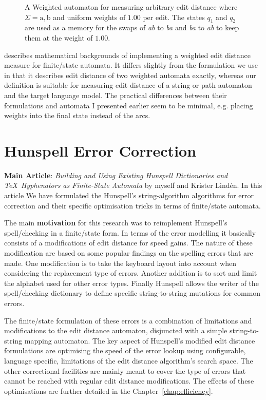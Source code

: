 \documentclass[officiallayout]{unihelcompling}
\begin{document}
\begin{figure}
    \caption{A Weighted automaton for measuring arbitrary edit distance where
        $\Sigma = {\mathrm{a}, \mathrm{b}}$ and uniform weights of $1.00$ per
        edit. The states $q_1$ and $q_2$ are used as a memory for
        the swaps of \emph{ab} to \emph{ba} and \emph{ba} to \emph{ab} to
        keep them at the weight of $1.00$. \label{fig:edit-weighted}}
\end{figure}

\citet{mohri2003edit} describes mathematical backgrounds of implementing a
weighted edit distance measure for finite\-/state automata. It differs slightly
from the formulation we use in that it describes edit distance of two weighted
automata exactly, whereas our definition is suitable for measuring edit
distance of a string or path automaton and the target language model. The
practical differences between their formulations and automata I presented
earlier seem to be minimal, e.g. placing weights into the final state instead
of the arcs.

\section{Hunspell Error Correction}
\label{sec:Hunspell-error}

\textbf{Main Article}: \emph{Building and Using Existing Hunspell Dictionaries
and \TeX\ Hyphenators as Finite-State Automata} by myself and Krister Lindén.
In this article We have formulated the Hunspell's string-algorithm algorithms for
error correction and their specific optimisation tricks in terms of
finite\-/state automata.

The main \textbf{motivation} for this research was to reimplement Hunspell's
spell\-/checking in a finite\-/state form. In terms of the  error modelling it
basically consists of a modifications of edit distance for speed gains. The
nature of these modification are based on some popular findings on the spelling
errors that are made. One modification is to take the keyboard layout into
account when considering the replacement type of errors. Another addition is to
sort and limit the alphabet used for other error types. Finally Hunspell allows
the writer of the spell\-/checking dictionary to define specific
string-to-string mutations for common errors.

The finite\-/state formulation of these errors is a combination of limitations
and modifications to the edit distance automaton, disjuncted with a simple
string-to-string mapping automaton. The key aspect of Hunspell's modified
edit distance formulations are optimising the speed of the error lookup using
configurable, language specific, limitations of the edit distance algorithm's
search space. The other correctional facilities are mainly meant to cover the
type of errors that cannot be reached with regular edit distance modifications.
The effects of these optimisations are further detailed in the 
Chapter~\ref{chap:efficiency}.
\end{document}
